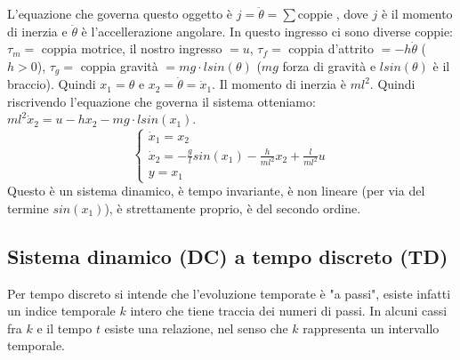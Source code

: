 L'equazione che governa questo oggetto è $j = \ddot{\theta} = \sum \text{coppie}\;$, dove $j$ è il momento di inerzia e $\ddot{\theta}$ è l'accellerazione angolare. In questo ingresso ci sono diverse coppie: $\tau_m =$ coppia motrice, il nostro ingresso $= u$, $\tau_f= $ coppia d'attrito $=-h \dot{\theta}$ ($h>0$), $\tau_g =$ coppia gravità $= mg \cdot  l sin(\theta)$ ($mg$ forza di gravità e $l sin(\theta)$ è il braccio).\newline
Quindi $x_1 = \theta$ e $x_2 = \dot{\theta} = \dot{x}_1$.\newline
Il momento di inerzia è $m l^2$.\newline
Quindi riscrivendo l'equazione che governa il sistema otteniamo: $m l^2 \dot{x}_2 = u - h x_2 - m g \cdot l sin(x_1)$.
\[
    \begin{cases}
        \dot{x}_1 = x_2\\
        \dot{x}_2 = - \frac{g}{l} sin(x_1) - \frac{h}{ml^2}x_2 + \frac{l}{ml^2}u\\
        y = x_1
    \end{cases}
\]
Questo è un sistema dinamico, è tempo invariante, è non lineare (per via del termine $sin(x_1)$), è strettamente proprio, è del secondo ordine.
\subsection{Sistema dinamico (DC) a tempo discreto (TD)}
Per tempo discreto si intende che l'evoluzione temporate è "a passi", esiste infatti un indice temporale $k$ intero che tiene traccia dei numeri di passi. In alcuni cassi fra $k$ e il tempo $t$ esiste una relazione, nel senso che $k$ rappresenta un intervallo temporale.\newline
